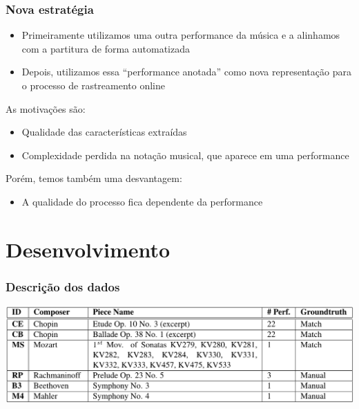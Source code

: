 \documentclass[serif,mathserif]{beamer}
\begin{document}
\begin{frame}
  \frametitle{Nova estratégia}
  \begin{itemize}
    \item Primeiramente utilizamos uma outra performance da música e a alinhamos com a partitura de forma automatizada\\\pause
    \item Depois, utilizamos essa ``performance anotada'' como nova representação para o processo de rastreamento online\pause
  \end{itemize}



  As motivações são:\pause
  \begin{itemize}
    \item Qualidade das características extraídas\\\pause %
    \item Complexidade perdida na notação musical, que aparece em uma performance\pause %
  \end{itemize}
  Porém, temos também uma desvantagem:\pause
  \begin{itemize}
    \item A qualidade do processo fica dependente da performance\\
  \end{itemize}
\end{frame}


\section{Desenvolvimento}
\begin{frame}
  \frametitle{Descrição dos dados}
  \begin{center}
    \includegraphics[width=\textwidth]{src/img/1-Table1-1.png}
  \end{center}
\end{frame}
\end{document}
